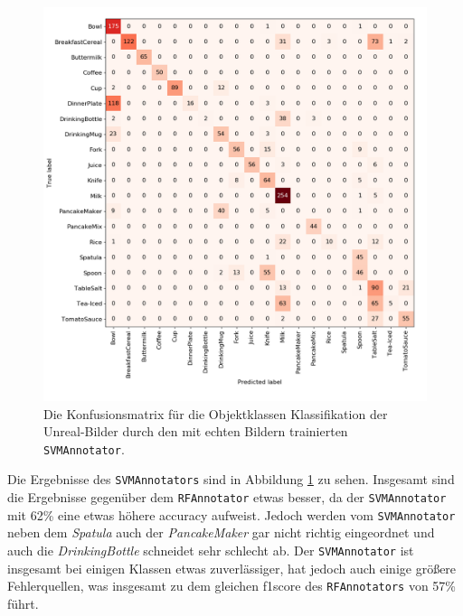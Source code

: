 \begin{figure}
\centering
	\includegraphics[scale=.315]{img/chapter6/SVMClassifierGTClass.png}
\caption[Konfusionsmatrix der Klassifizierung der Objektklassen durch den SVMAnnotator]{Die Konfusionsmatrix für die Objektklassen Klassifikation der Unreal-Bilder durch den mit echten Bildern trainierten \texttt{SVMAnnotator}.}
\label{fig:SVMClassifierGTClass_confMatrix}
\end{figure}


Die Ergebnisse des \texttt{SVMAnnotators} sind in Abbildung  \ref{fig:SVMClassifierGTClass_confMatrix} zu sehen. Insgesamt sind die Ergebnisse gegenüber dem \texttt{RFAnnotator} etwas besser, da der \texttt{SVMAnnotator} mit 62\% eine etwas höhere \gls{accuracy} aufweist. Jedoch werden vom \texttt{SVMAnnotator} neben dem \textit{Spatula} auch der \textit{PancakeMaker} gar nicht richtig eingeordnet und auch die \textit{DrinkingBottle} schneidet sehr schlecht ab. Der \texttt{SVMAnnotator} ist insgesamt bei einigen Klassen etwas zuverlässiger, hat jedoch auch einige größere Fehlerquellen, was insgesamt zu dem gleichen \gls{f1score} des \texttt{RFAnnotators} von 57\% führt.  

